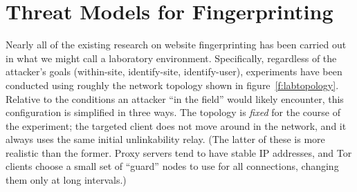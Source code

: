 \section{Threat Models for Fingerprinting}

\begin{figure*}%
%
\caption{Laboratory topology for fingerprinting experiments.}%
\label{f:labtopology}%
\end{figure*}

Nearly all of the existing research on website fingerprinting has been
carried out in what we might call a laboratory environment.
Specifically, regardless of the attacker's goals (within-site,
identify-site, identify-user), experiments have been conducted using
roughly the network topology shown in figure~\ref{f:labtopology}.
Relative to the conditions an attacker “in the field” would likely
encounter, this configuration is simplified in three ways.  The
topology is \emph{fixed} for the course of the experiment; the
targeted client does not move around in the network, and it always
uses the same initial unlinkability relay.  (The latter of these is
more realistic than the former.  Proxy servers tend to have stable IP
addresses, and Tor clients choose a small set of “guard” nodes to use
for all connections, changing them only at long intervals.)

